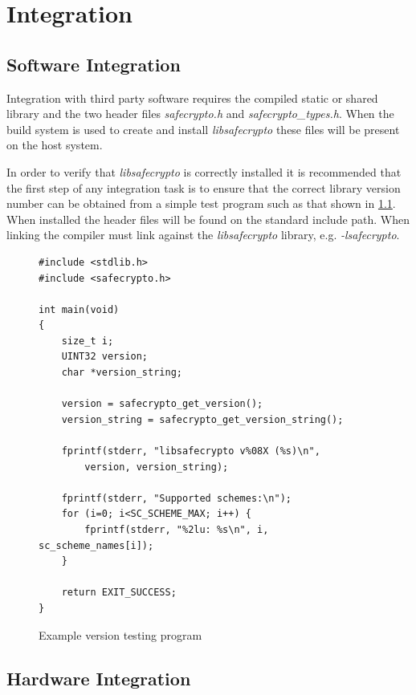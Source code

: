 \chapter{Integration}
\label{ch_hardware_integration}

\section{Software Integration}

Integration with third party software requires the compiled static or shared library and the two header files \textit{safecrypto.h} and \textit{safecrypto\_types.h}. When the build system is used to create and install \textit{libsafecrypto} these files will be present on the host system.

In order to verify that \textit{libsafecrypto} is correctly installed it is recommended that the first step of any integration task is to ensure that the correct library version number can be obtained from a simple test program such as that shown in \ref{fig:version_program}. When installed the header files will be found on the standard include path. When linking the compiler must link against the \textit{libsafecrypto} library, e.g. \textit{-lsafecrypto}.

\begin{figure}[H]
\centering
\begin{BVerbatim}
#include <stdlib.h>
#include <safecrypto.h>

int main(void)
{
    size_t i;
    UINT32 version;
    char *version_string;

    version = safecrypto_get_version();
    version_string = safecrypto_get_version_string();

    fprintf(stderr, "libsafecrypto v%08X (%s)\n",
        version, version_string);

    fprintf(stderr, "Supported schemes:\n");
    for (i=0; i<SC_SCHEME_MAX; i++) {
        fprintf(stderr, "%2lu: %s\n", i, sc_scheme_names[i]);
    }

    return EXIT_SUCCESS;
}
\end{BVerbatim}
\caption{Example version testing program}
\label{fig:version_program}
\end{figure}



\section{Hardware Integration}


